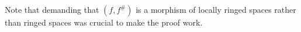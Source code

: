 Note that demanding that $(f, f^\#)$ is a morphism of locally ringed spaces rather
than ringed spaces was crucial to make the proof work.

